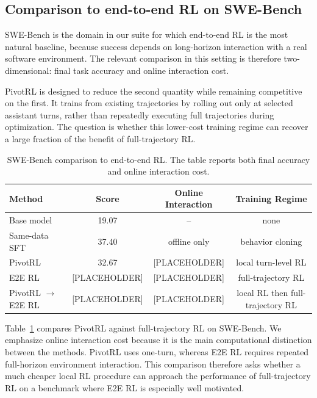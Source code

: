 \subsection{Comparison to end-to-end RL on SWE-Bench}
\label{sec:swe_e2e}

SWE-Bench is the domain in our suite for which end-to-end RL is the most natural baseline, because success depends on long-horizon interaction with a real software environment. The relevant comparison in this setting is therefore two-dimensional: final task accuracy and online interaction cost.

PivotRL is designed to reduce the second quantity while remaining competitive on the first. It trains from existing trajectories by rolling out only at selected assistant turns, rather than repeatedly executing full trajectories during optimization. The question is whether this lower-cost training regime can recover a large fraction of the benefit of full-trajectory RL.

\begin{table}[t]
\centering
\small
\begin{tabular}{lccc}
\toprule
\textbf{Method} & \textbf{Score} & \textbf{Online Interaction} & \textbf{Training Regime} \\
\midrule
Base model & 19.07 & -- & none \\
Same-data SFT & 37.40 & offline only & behavior cloning \\
PivotRL & 32.67 & [PLACEHOLDER] & local turn-level RL \\
E2E RL & [PLACEHOLDER] & [PLACEHOLDER] & full-trajectory RL \\
PivotRL $\rightarrow$ E2E RL & [PLACEHOLDER] & [PLACEHOLDER] & local RL then full-trajectory RL \\
\bottomrule
\end{tabular}
\caption{
SWE-Bench comparison to end-to-end RL.
The table reports both final accuracy and online interaction cost.
}
\label{tab:swe_e2e}
\end{table}

Table~\ref{tab:swe_e2e} compares PivotRL against full-trajectory RL on SWE-Bench. We emphasize online interaction cost because it is the main computational distinction between the methods. PivotRL uses one-turn, whereas E2E RL requires repeated full-horizon environment interaction. This comparison therefore asks whether a much cheaper local RL procedure can approach the performance of full-trajectory RL on a benchmark where E2E RL is especially well motivated.

